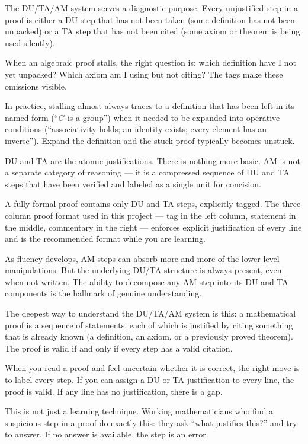 \begin{remark}
The DU/TA/AM system serves a diagnostic purpose. Every unjustified step
in a proof is either a DU step that has not been taken (some definition
has not been unpacked) or a TA step that has not been cited (some axiom
or theorem is being used silently).

When an algebraic proof stalls, the right question is: which definition
have I not yet unpacked? Which axiom am I using but not citing? The
tags make these omissions visible.

In practice, stalling almost always traces to a definition that has
been left in its named form (``$G$ is a group'') when it needed to be
expanded into operative conditions (``associativity holds; an identity
exists; every element has an inverse''). Expand the definition and
the stuck proof typically becomes unstuck.
\end{remark}

\begin{remark}
DU and TA are the atomic justifications. There is nothing more basic.
AM is not a separate category of reasoning --- it is a compressed
sequence of DU and TA steps that have been verified and labeled as
a single unit for concision.

A fully formal proof contains only DU and TA steps, explicitly tagged.
The three-column proof format used in this project --- tag in the left
column, statement in the middle, commentary in the right --- enforces
explicit justification of every line and is the recommended format
while you are learning.

As fluency develops, AM steps can absorb more and more of the lower-level
manipulations. But the underlying DU/TA structure is always present,
even when not written. The ability to decompose any AM step into its
DU and TA components is the hallmark of genuine understanding.
\end{remark}

\begin{remark}
The deepest way to understand the DU/TA/AM system is this: a mathematical
proof is a sequence of statements, each of which is justified by citing
something that is already known (a definition, an axiom, or a previously
proved theorem). The proof is valid if and only if every step has a valid
citation.

When you read a proof and feel uncertain whether it is correct, the
right move is to label every step. If you can assign a DU or TA
justification to every line, the proof is valid. If any line has no
justification, there is a gap.

This is not just a learning technique. Working mathematicians who find
a suspicious step in a proof do exactly this: they ask ``what justifies
this?'' and try to answer. If no answer is available, the step is an error.
\end{remark}
